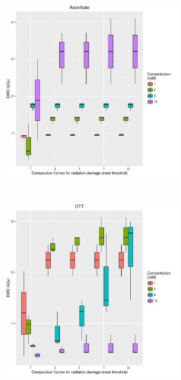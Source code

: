 \begin{figure}
    \centering
    \begin{subfigure}[b]{0.75\textwidth}
            \centering
            \includegraphics[width=\textwidth]{figures/saxs/Ascorbate_Num_consec_fr_comp.pdf}
            \caption{}
            \label{}
    \end{subfigure}
    \\
    \begin{subfigure}[b]{0.75\textwidth}
            \centering
            \includegraphics[width=\textwidth]{figures/saxs/DTT_Num_consec_fr_comp.pdf}
            \caption{}
            \label{fig:Num consec frames - DTT}
    \end{subfigure}
\end{figure}
